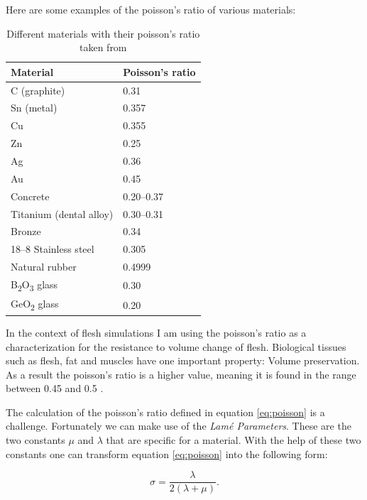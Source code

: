 Here are some examples of the poisson's ratio of various materials:

\begin{table}[!htbp]
\centering
    \begin{tabular}{ | l | l |}
    \hline
    \textbf{Material} & \textbf{Poisson's ratio} \\ \hline
    C (graphite) & 0.31 \\ \hline
    Sn (metal) & 0.357 \\ \hline
    Cu & 0.355 \\ \hline
    Zn & 0.25 \\ \hline
    Ag & 0.36 \\ \hline
    Au & 0.45 \\ \hline
    Concrete & 0.20–0.37 \\ \hline
    Titanium (dental alloy) & 0.30–0.31 \\ \hline
    Bronze & 0.34 \\ \hline
    18–8 Stainless steel & 0.305 \\ \hline
    Natural rubber & 0.4999 \\ \hline
	B\textsubscript{2}O\textsubscript{3} glass & 0.30 \\ \hline
	GeO\textsubscript{2} glass & 0.20 \\ \hline	
    \end{tabular}
    \caption{Different materials with their poisson's ratio taken from \cite{PhysRevB.80.132104}}
\label{table:1}
\end{table}

In the context of flesh simulations I am using the poisson's ratio as a characterization for the resistance to volume change of flesh. Biological tissues such as flesh, fat and muscles have one important property: Volume preservation. As a result the poisson's ratio is a higher value, meaning it is found in the range between 0.45 and 0.5 \cite{Smith:2018:SNF:3191713.3180491}.

The calculation of the poisson's ratio defined in equation \ref{eq:poisson} is a challenge. Fortunately we can make use of the \textit{Lamé Parameters}. These are the two constants $\mu$ and $\lambda$ that are specific for a material. With the help of these two constants one can transform equation \ref{eq:poisson} into the following form:

\begin{equation}\label{eq:poisson_ratio}
\sigma =  \frac{\lambda}{2(\lambda + \mu)}.
\end{equation}

